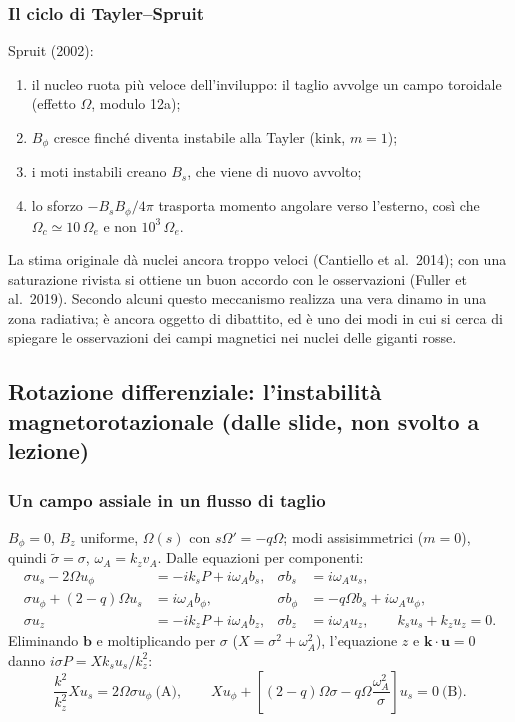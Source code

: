 \subsubsection{Il ciclo di Tayler--Spruit}

Spruit (2002):
\begin{enumerate}
\item il nucleo ruota più veloce dell'inviluppo: il taglio avvolge un campo toroidale (effetto $\Omega$, modulo 12a);
\item $B_\phi$ cresce finché diventa instabile alla Tayler (kink, $m=1$);
\item i moti instabili creano $B_s$, che viene di nuovo avvolto;
\item lo sforzo $-B_sB_\phi/4\pi$ trasporta momento angolare verso l'esterno, così che $\Omega_c\simeq10\,\Omega_e$ e non $10^3\,\Omega_e$.
\end{enumerate}
La stima originale dà nuclei ancora troppo veloci (Cantiello et al.\ 2014); con una saturazione rivista si ottiene un buon accordo con le osservazioni (Fuller et al.\ 2019). Secondo alcuni questo meccanismo realizza una vera dinamo in una zona radiativa; è ancora oggetto di dibattito, ed è uno dei modi in cui si cerca di spiegare le osservazioni dei campi magnetici nei nuclei delle giganti rosse.

\subsection{Rotazione differenziale: l'instabilità magnetorotazionale (dalle slide, non svolto a lezione)}

\subsubsection{Un campo assiale in un flusso di taglio}
$B_\phi=0$, $B_z$ uniforme, $\Omega(s)$ con $s\Omega'=-q\Omega$; modi assisimmetrici ($m=0$), quindi $\tilde\sigma=\sigma$, $\omega_A=k_zv_A$. Dalle equazioni per componenti:
\begin{align}
\sigma u_s-2\Omega u_\phi&=-ik_sP+i\omega_Ab_s, & \sigma b_s&=i\omega_Au_s,\\
\sigma u_\phi+(2-q)\Omega u_s&=i\omega_Ab_\phi, & \sigma b_\phi&=-q\Omega b_s+i\omega_Au_\phi,\\
\sigma u_z&=-ik_zP+i\omega_Ab_z, & \sigma b_z&=i\omega_Au_z,\qquad k_su_s+k_zu_z=0 .
\end{align}
Eliminando $\mathbf{b}$ e moltiplicando per $\sigma$ ($X=\sigma^2+\omega_A^2$), l'equazione $z$ e $\mathbf{k}\cdot\mathbf{u}=0$ danno $i\sigma P=Xk_su_s/k_z^2$:
\begin{equation}
\frac{k^2}{k_z^2}Xu_s=2\Omega\sigma u_\phi\ \text{(A)},\qquad
Xu_\phi+\left[(2-q)\Omega\sigma-q\Omega\frac{\omega_A^2}{\sigma}\right]u_s=0\ \text{(B)}.
\end{equation}

